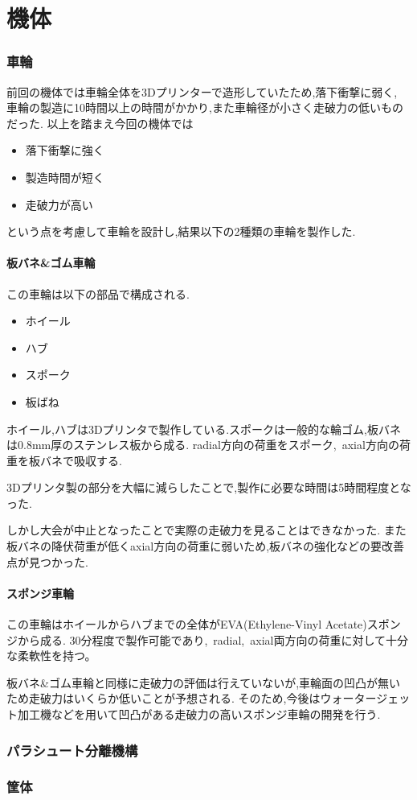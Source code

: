 \part*{機体}
\section{車輪}
前回の機体では車輪全体を3Dプリンターで造形していたため,落下衝撃に弱く,
車輪の製造に10時間以上の時間がかかり,また車輪径が小さく走破力の低いものだった.
以上を踏まえ今回の機体では 
\begin{itemize}
  \item 落下衝撃に強く
  \item 製造時間が短く
  \item 走破力が高い
\end{itemize}
という点を考慮して車輪を設計し,結果以下の2種類の車輪を製作した.
\vfill\null
\columnbreak
\subsection{板バネ\&ゴム車輪}
この車輪は以下の部品で構成される.
\begin{itemize}
  \item ホイール
  \item ハブ
  \item スポーク
  \item 板ばね
\end{itemize}
ホイール,ハブは3Dプリンタで製作している.スポークは一般的な輪ゴム,板バネは0.8mm厚のステンレス板から成る.
radial方向の荷重をスポーク,\ axial方向の荷重を板バネで吸収する.

3Dプリンタ製の部分を大幅に減らしたことで,製作に必要な時間は5時間程度となった.

しかし大会が中止となったことで実際の走破力を見ることはできなかった.
また板バネの降伏荷重が低くaxial方向の荷重に弱いため,板バネの強化などの要改善点が見つかった.
\vfill\null
\columnbreak
\subsection{スポンジ車輪}
この車輪はホイールからハブまでの全体がEVA(Ethylene-Vinyl Acetate)スポンジから成る.
30分程度で製作可能であり,\ radial,\ axial両方向の荷重に対して十分な柔軟性を持つ。

板バネ\&ゴム車輪と同様に走破力の評価は行えていないが,車輪面の凹凸が無いため走破力はいくらか低いことが予想される.
そのため,今後はウォータージェット加工機などを用いて凹凸がある走破力の高いスポンジ車輪の開発を行う.
\section{パラシュート分離機構}
\section{筐体}